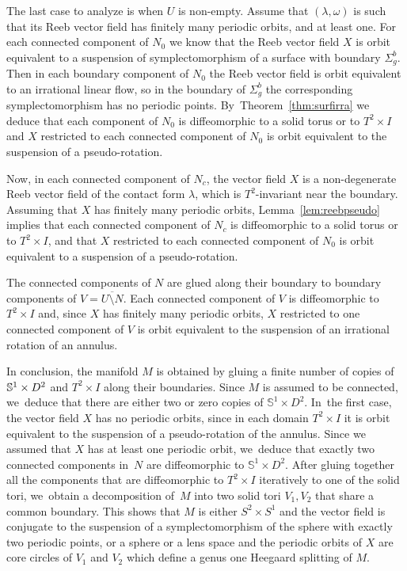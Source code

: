 \documentclass[11pt]{article}
\theoremstyle{definition}
\newcommand{\mS}{\mathbb{S}}
\begin{document}
The last case to analyze is when $U$ is non-empty. Assume that $(\lambda,\omega)$ is such that its Reeb vector field has finitely many periodic orbits, and at least one. For each connected component of $N_0$ we know that the Reeb vector field $X$ is orbit equivalent to a suspension of symplectomorphism of a surface with boundary $\Sigma_g^b$. Then in each boundary component of $N_0$ the Reeb vector field is orbit equivalent to an irrational linear flow, so in the boundary of $\Sigma_g^b$ the corresponding symplectomorphism has no periodic points. By~Theorem~\ref{thm:surfirra} we deduce that each component of $N_0$ is diffeomorphic to a solid torus or to $T^2\times I$ and $X$ restricted to each connected component of $N_0$ is orbit equivalent to the suspension of a pseudo-rotation.

Now, in each connected component of $N_c$, the vector field $X$ is a non-degenerate Reeb vector field of the contact form $\lambda$, which is $T^2$-invariant near the boundary.
Assuming that $X$ has finitely many periodic orbits, Lemma~\ref{lem:reebpseudo} implies that each connected component of $N_c$ is diffeomorphic to a solid torus or to $T^2\times I$, and that $X$ restricted to each connected component of $N_0$ is orbit equivalent to a suspension of a pseudo-rotation.

The connected components of $N$ are glued along their boundary to boundary components of $V=\overline{U\setminus N}$. Each connected component of $V$ is diffeomorphic to $T^2\times I$ and, since $X$ has finitely many periodic orbits, $X$ restricted to one connected component of $V$ is orbit equivalent to the suspension of an irrational rotation of an annulus.

In conclusion, the manifold $M$ is obtained by gluing a finite number of copies of $\mS^1\times\nobreak D^2$ and $T^2\times I$ along their boundaries. Since $M$ is assumed to be connected, we~deduce that there are either two or zero copies of $\mS^1\times D^2$. In~the first case, the vector field $X$ has no periodic orbits, since in each domain $T^2\times I$ it is orbit equivalent to the suspension of a pseudo-rotation of the annulus. Since we assumed that $X$ has at least one periodic orbit, we~deduce that exactly two connected components in~$N$ are diffeomorphic to $\mS^1\times D^2$. After gluing together all the components that are diffeomorphic to $T^2\times I$ iteratively to one of the solid tori, we~obtain a decomposition of~$M$ into two solid tori $V_1, V_2$ that share a common boundary. This shows that $M$ is either $S^2\times S^1$ and the vector field is conjugate to the suspension of a symplectomorphism of the sphere with exactly two periodic points, or a sphere or a lens space and the periodic orbits of $X$ are core circles of $V_1$ and $V_2$ which define a genus one Heegaard splitting of $M$.
\end{document}
